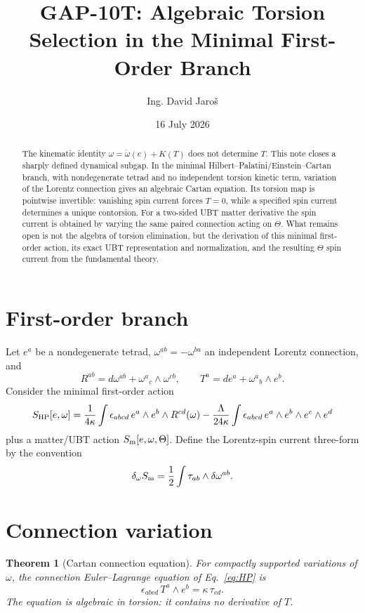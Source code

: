 \documentclass[12pt,a4paper]{article}
\title{GAP-10T: Algebraic Torsion Selection in the Minimal First-Order Branch}
\author{Ing. David Jaro\v{s}}
\date{16 July 2026}
\newtheorem{theorem}[definition]{Theorem}
\theoremstyle{remark}\newtheorem{remark}[definition]{Remark}
\begin{document}
\maketitle
\UBTProvenanceNotice

\begin{abstract}
The kinematic identity $\omega=\mathring\omega(e)+K(T)$ does not determine
$T$.  This note closes a sharply defined dynamical subgap.  In the minimal
Hilbert--Palatini/Einstein--Cartan branch, with nondegenerate tetrad and no
independent torsion kinetic term, variation of the Lorentz connection gives an
algebraic Cartan equation.  Its torsion map is pointwise invertible: vanishing
spin current forces $T=0$, while a specified spin current determines a unique
contorsion.  For a two-sided UBT matter derivative the spin current is obtained
by varying the same paired connection acting on $\Theta$.  What remains open is
not the algebra of torsion elimination, but the derivation of this minimal
first-order action, its exact UBT representation and normalization, and the
resulting $\Theta$ spin current from the fundamental theory.
\end{abstract}

\section{First-order branch}
Let $e^a$ be a nondegenerate tetrad, $\omega^{ab}=-\omega^{ba}$ an independent
Lorentz connection, and
\[
 R^{ab}=d\omega^{ab}+\omega^a{}_c\wedge\omega^{cb},\qquad
 T^a=de^a+\omega^a{}_b\wedge e^b.
\]
Consider the minimal first-order action
\begin{equation}
 S_{\rm HP}[e,\omega]
 =\frac{1}{4\kappa}\int
 \epsilon_{abcd}\,e^a\wedge e^b\wedge R^{cd}(\omega)
 -\frac{\Lambda}{24\kappa}\int
 \epsilon_{abcd}\,e^a\wedge e^b\wedge e^c\wedge e^d
 \label{eq:HP}
\end{equation}
plus a matter/UBT action $S_{\rm m}[e,\omega,\Theta]$.  Define the Lorentz-spin
current three-form by the convention
\begin{equation}
 \delta_\omega S_{\rm m}
 =\frac12\int \tau_{ab}\wedge\delta\omega^{ab}.
 \label{eq:spin-current-def}
\end{equation}

\section{Connection variation}
\begin{theorem}[Cartan connection equation]
For compactly supported variations of $\omega$, the connection Euler--Lagrange
equation of Eq.~\eqref{eq:HP} is
\begin{equation}
 \boxed{\epsilon_{abcd}\,T^a\wedge e^b=\kappa\,\tau_{cd}.}
 \label{eq:cartan}
\end{equation}
The equation is algebraic in torsion: it contains no derivative of $T$.
\end{theorem}
\end{document}
